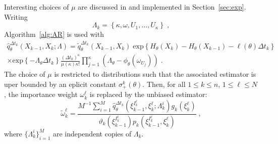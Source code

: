 \documentclass[12pt]{article}
\newcommand{\rmd}{\mathrm{d}}
\newcommand{\eqsp}{\;}
\newcommand{\1}{\mathrm{1}}
\begin{document}
Interesting choices of $\mu$ are discussed in \cite{beskos:papaspiliopoulos:roberts:fearnhead:2006} and implemented in Section~\ref{sec:exp}. Writing
\[
\Lambda_k = \left\{\kappa,\omega,U_1,\ldots,U_\kappa\right\}\eqsp,
\]
Algorithm~\ref{alg:AR} is used with 
\begin{multline*}
\widehat{q}^{\Delta t_k}_{\theta}(X_{k-1},X_k;\Lambda) = \widetilde{q}^{\Delta t_k}_{\theta}(X_{k-1},X_k) \eqsp\mathrm{exp}\left\{H_{\theta}(X_k) - H_{\theta}(X_{k-1})-\ell(\theta)\Delta t_k\right\}\\ 
\times\mathrm{exp}\left\{-\Lambda_{\theta}\Delta t_k\right\}\frac{(\Delta t_k)^{\kappa}}{\mu(\kappa)\kappa!}\prod_{j=1}^{\kappa}\left(\Lambda_{\theta}-\phi_{\theta}(\omega_{U_j})\right)\eqsp.
\end{multline*}
The choice of $\mu$ is restricted to distributions such that the associated estimator is uper bounded by an eplicit constant $\sigma_+^k(\theta)$. Then, for all $1\le k \le n$, $1\le \ell\le N$, the importance weight $\omega_k^{\ell}$ is replaced by the unbiased estimator:
\begin{equation}
\label{eq:random:weight}
\widetilde{\omega}_k^{\ell} = \frac{M^{-1}\sum_{i=1}^M\widehat{q}_{\theta}^{\Delta t_{k}}(\xi_{k-1}^{I^{\ell}_k},\xi^{\ell}_k;\Lambda_k^i)g_k(\xi^{\ell}_k)}{\vartheta_k(\xi^{I^{\ell}_k}_{k-1}) p_k (\xi_{k-1}^{I^{\ell}_k},\xi^{\ell}_k)}\eqsp,
\end{equation}
where $\{\Lambda_k^i\}_{i=1}^M$ are independent copies of $\Lambda_k$. 
\end{document}
